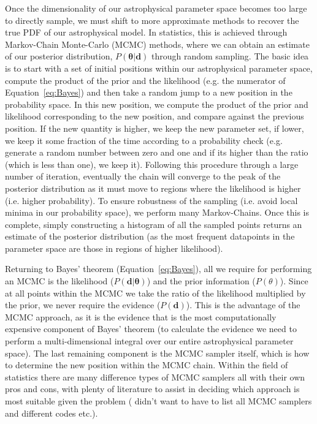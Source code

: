 Once the dimensionality of our astrophysical parameter space becomes too large to directly sample, we must shift to more approximate methods to recover the true PDF of our astrophysical model. In statistics, this is achieved through Markov-Chain Monte-Carlo (MCMC) methods, where we can obtain an estimate of our posterior distribution, $P(\mathbf{\theta}|\mathbf{d})$ through random sampling. The basic idea is to start with a set of initial positions within our astrophysical parameter space, compute the product of the prior and the likelihood (e.g. the numerator of Equation~\ref{eq:Bayes}) and then take a random jump to a new position in the probability space. In this new position, we compute the product of the prior and likelihood corresponding to the new position, and compare against the previous position. If the new quantity is higher, we keep the new parameter set, if lower, we keep it some fraction of the time according to a probability check (e.g. generate a random number between zero and one and if its higher than the ratio (which is less than one), we keep it). Following this procedure through a large number of iteration, eventually the chain will converge to the peak of the posterior distribution as it must move to regions where the likelihood is higher (i.e. higher probability). To ensure robustness of the sampling (i.e. avoid local minima in our probability space), we perform many Markov-Chains. Once this is complete, simply constructing a histogram of all the sampled points returns an estimate of the posterior distribution (as the most frequent datapoints in the parameter space are those in regions of higher likelihood).

Returning to Bayes' theorem (Equation~\ref{eq:Bayes}), all we require for performing an MCMC is the likelihood ($P(\mathbf{\mathbf{d}|\theta})$) and the prior information ($P(\theta)$). Since at all points within the MCMC we take the ratio of the likelihood multiplied by the prior, we never require the evidence ($P(\mathbf{d})$). This is the advantage of the MCMC approach, as it is the evidence that is the most computationally expensive component of Bayes' theorem (to calculate the evidence we need to perform a multi-dimensional integral over our entire astrophysical parameter space). The last remaining component is the MCMC sampler itself, which is how to determine the new position within the MCMC chain. Within the field of statistics there are many difference types of MCMC samplers all with their own pros and cons, with plenty of literature to assist in deciding which approach is most suitable given the problem ({\color{red} didn't want to have to list all MCMC samplers and different codes etc.}).

